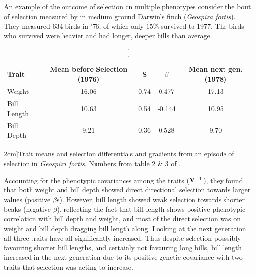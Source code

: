 

 An example of the outcome of selection on multiple phenotypes
 consider the bout of selection measured by
 \citet{grant1995predicting}  in medium ground Darwin's
 finch ({\it Geospiza fortis}).  They measured 634 birds in '76, of
 which only $15\%$ survived to 1977. The birds who survived were
 heavier and had longer, deeper bills than average.\\
 \begin{table}
 \begin{tabular}{lcccc}\\
 {\small Trait} & {\small Mean before Selection (1976)} & S & $\beta$
   & {\small Mean next gen. (1978)}\\
   \hline
 Weight & 16.06 & 0.74 & 0.477 & 17.13 \\
Bill Length & 10.63 &  0.54  & -0.144  & 10.95 \\
  Bill Depth & 9.21 & 0.36 & 0.528  &  9.70 
 \end{tabular}
 \caption[][2cm]{Trait means and selection differentials and gradients from an
   episode of selection in {\it Geospiza fortis}. Numbers from table
   2 \& 3 of \citet{grant1995predicting}.}
 \end{table}
 Accounting for the phenotypic covariances among the traits ($\bf{V}^{-1}$), they found that both
 weight and bill depth showed direct directional selection towards larger
 values (positive $\beta$s). However, bill length showed weak
 selection towards shorter beaks (negative $\beta$), reflecting the fact that bill length shows positive phenotypic correlation with
 bill depth and weight, and most of the direct selection was on weight
 and bill depth dragging bill length along. Looking at the next
 generation all three traits have all significantly increased. Thus
 despite selection posssibly favouring shorter bill lengths, and
 certainly not favouring long bills, bill length increased in the next
 generation due to its positive genetic covariance with two traits
 that selection was acting to increase. 



